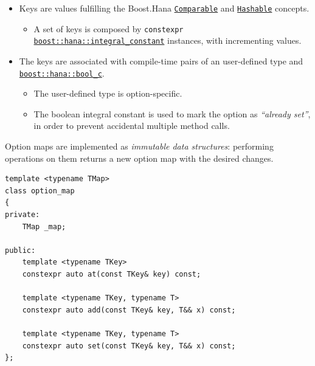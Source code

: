 \documentclass[twoside, 12pt, a4paper, openany]{book}
\providecommand{\tightlist}{%
  \setlength{\itemsep}{0pt}\setlength{\parskip}{0pt}}
\begin{document}
\begin{itemize}
\item
  Keys are values fulfilling the Boost.Hana
  \href{http://www.boost.org/doc/libs/1_61_0/libs/hana/doc/html/group__group-Comparable.html}{\texttt{Comparable}}
  and
  \href{http://www.boost.org/doc/libs/1_61_0/libs/hana/doc/html/group__group-Hashable.html}{\texttt{Hashable}}
  concepts.

  \begin{itemize}
  \tightlist
  \item
    A set of keys is composed by
    \texttt{constexpr}
    \href{http://www.boost.org/doc/libs/1_61_0/libs/hana/doc/html/structboost_1_1hana_1_1integral__constant.html}{\texttt{boost::hana::integral_constant}}
    instances, with incrementing values.
  \end{itemize}
\item
  The keys are associated with compile-time pairs of an user-defined
  type and
  \href{http://www.boost.org/doc/libs/1_61_0/libs/hana/doc/html/structboost_1_1hana_1_1integral__constant.html\#aa301b96de91d665fdc846bde4659b0d3}{\texttt{boost::hana::bool_c}}.

  \begin{itemize}
  \item
    The user-defined type is option-specific.
  \item
    The boolean integral constant is used to mark the option as
    \emph{``already set''}, in order to prevent accidental multiple
    method calls.
  \end{itemize}
\end{itemize}

Option maps are implemented as \emph{immutable data structures}:
performing operations on them returns a new option map with the desired
changes.

\begin{verbatim}
template <typename TMap>
class option_map
{
private:
    TMap _map;

public:
    template <typename TKey>
    constexpr auto at(const TKey& key) const;

    template <typename TKey, typename T>
    constexpr auto add(const TKey& key, T&& x) const;

    template <typename TKey, typename T>
    constexpr auto set(const TKey& key, T&& x) const;
};
\end{verbatim}
\end{document}
